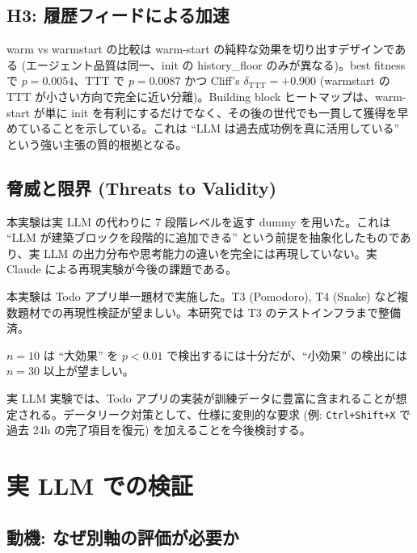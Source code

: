 \documentclass[a4paper,11pt]{ltjsarticle}
\begin{document}
\subsection{H3: 履歴フィードによる加速}

warm vs warmstart の比較は warm-start の純粋な効果を切り出すデザインである (エージェント品質は同一、init の history\_floor のみが異なる)。best fitness で $p = 0.0054$、TTT で $p = 0.0087$ かつ Cliff's $\delta_{\text{TTT}} = +0.900$ (warmstart の TTT が小さい方向で完全に近い分離)。Building block ヒートマップは、warm-start が単に init を有利にするだけでなく、その後の世代でも一貫して獲得を早めていることを示している。これは ``LLM は過去成功例を真に活用している'' という強い主張の質的根拠となる。

\subsection{脅威と限界 (Threats to Validity)}

\begin{description}[leftmargin=2em,itemsep=2pt]
  \item[Dummy LLM の限界] 本実験は実 LLM の代わりに 7 段階レベルを返す dummy を用いた。これは ``LLM が建築ブロックを段階的に追加できる'' という前提を抽象化したものであり、実 LLM の出力分布や思考能力の違いを完全には再現していない。実 Claude による再現実験が今後の課題である。
  \item[題材の汎用性] 本実験は Todo アプリ単一題材で実施した。T3 (Pomodoro), T4 (Snake) など複数題材での再現性検証が望ましい。本研究では T3 のテストインフラまで整備済。
  \item[サンプルサイズ] $n = 10$ は ``大効果'' を $p < 0.01$ で検出するには十分だが、``小効果'' の検出には $n = 30$ 以上が望ましい。
  \item[データリーク] 実 LLM 実験では、Todo アプリの実装が訓練データに豊富に含まれることが想定される。データリーク対策として、仕様に変則的な要求 (例: \texttt{Ctrl+Shift+X} で過去 24h の完了項目を復元) を加えることを今後検討する。
\end{description}

\section{実 LLM での検証}

\subsection{動機: なぜ別軸の評価が必要か}
\end{document}
